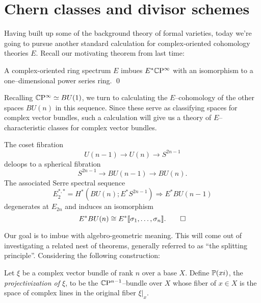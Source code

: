 







\section{Chern classes and divisor schemes}

Having built up some of the background theory of formal varieties, today we're going to pursue another standard calculation for complex-oriented cohomology theories $E$.  Recall our motivating theorem from last time:
\begin{corollary}
A complex-oriented ring spectrum $E$ imbues $E^* \CP^\infty$ with an isomorphism to a one--dimensional power series ring. \qed
\end{corollary}

\noindent Recalling $\CP^\infty \simeq BU(1)$, we turn to calculating the $E$--cohomology of the other spaces $BU(n)$ in this sequence.  Since these serve as classifying spaces for complex vector bundles, such a calculation will give us a theory of $E$--characteristic classes for complex vector bundles.

\begin{lemma}\label{ECohomologyOfBUn}
The coset fibration \[U(n-1) \to U(n) \to S^{2n-1}\] deloops to a spherical fibration \[S^{2n-1} \to BU(n-1) \to BU(n).\]  The associated Serre spectral sequence \[E_2^{*, *} = H^*(BU(n); E^* S^{2n-1}) \Rightarrow E^* BU(n-1)\] degenerates at $E_{2n}$ and induces an isomorphism \[E^* BU(n) \cong E^* \llbracket \sigma_1, \ldots, \sigma_n\rrbracket. \qed\]
\end{lemma}

Our goal is to imbue  with algebro-geometric meaning.  This will come out of investigating a related nest of theorems, generally referred to as ``the splitting principle''.  Considering the following construction:
\begin{definition}
Let $\xi$ be a complex vector bundle of rank $n$ over a base $X$.  Define $\P(xi)$, the \textit{projectivization of $\xi$}, to be the $\CP^{n-1}$--bundle over $X$ whose fiber of $x \in X$ is the space of complex lines in the original fiber $\xi|_x$.
\end{definition}

